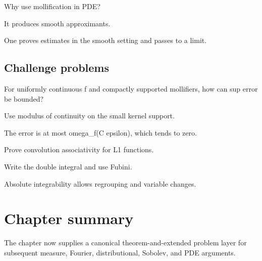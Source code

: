 \begin{exercise}\label{exr:iii10-expand-14}
Why use mollification in PDE?
\end{exercise}
\begin{hint}
It produces smooth approximants.
\end{hint}
\begin{solution}
One proves estimates in the smooth setting and passes to a limit.
\end{solution}

\subsection*{Challenge problems}

\begin{exercise}\label{exr:iii10-expand-15}
For uniformly continuous f and compactly supported mollifiers, how can sup error be bounded?
\end{exercise}
\begin{hint}
Use modulus of continuity on the small kernel support.
\end{hint}
\begin{solution}
The error is at most omega\_f(C epsilon), which tends to zero.
\end{solution}

\begin{exercise}[Associativity]\label{exr:iii10-expand-16}
Prove convolution associativity for L1 functions.
\end{exercise}
\begin{hint}
Write the double integral and use Fubini.
\end{hint}
\begin{solution}
Absolute integrability allows regrouping and variable changes.
\end{solution}
\section*{Chapter summary}
The chapter now supplies a canonical theorem-and-extended problem layer for subsequent measure, Fourier, distributional, Sobolev, and PDE arguments.

